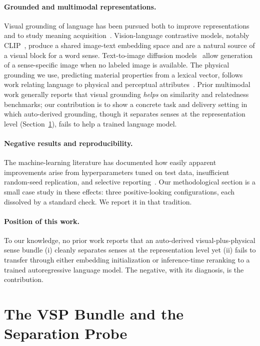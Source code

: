 \documentclass[twoside,11pt]{article}
\begin{document}
\paragraph{Grounded and multimodal representations.}
Visual grounding of language has been pursued both to improve representations and to study meaning acquisition~\citep{bruni2014,kiela2014}. Vision-language contrastive models, notably CLIP~\citep{radford2021}, produce a shared image-text embedding space and are a natural source of a visual block for a word sense. Text-to-image diffusion models~\citep{rombach2022} allow generation of a sense-specific image when no labeled image is available. The physical grounding we use, predicting material properties from a lexical vector, follows work relating language to physical and perceptual attributes~\citep{lynott2020}. Prior multimodal work generally reports that visual grounding \emph{helps} on similarity and relatedness benchmarks; our contribution is to show a concrete task and delivery setting in which auto-derived grounding, though it separates senses at the representation level (Section~\ref{sec:probe}), fails to help a trained language model.

\paragraph{Negative results and reproducibility.}
The machine-learning literature has documented how easily apparent improvements arise from hyperparameters tuned on test data, insufficient random-seed replication, and selective reporting~\citep{henderson2018,dodge2019,gundersen2018}. Our methodological section is a small case study in these effects: three positive-looking configurations, each dissolved by a standard check. We report it in that tradition.

\paragraph{Position of this work.}
To our knowledge, no prior work reports that an auto-derived visual-plus-physical sense bundle (i) cleanly separates senses at the representation level yet (ii) fails to transfer through either embedding initialization or inference-time reranking to a trained autoregressive language model. The negative, with its diagnosis, is the contribution.

\section{The VSP Bundle and the Separation Probe}
\label{sec:probe}
\end{document}
